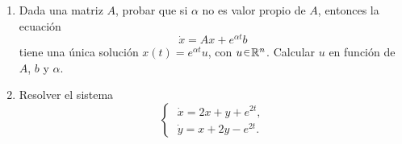 \begin{ejer}
\begin{enumerate}[label = (\alph*)]
\item Dada una matriz $A$, probar que si $\alpha$ no es valor propio de $A$,
entonces la ecuación
\[
\dot{x} = Ax + e^{\alpha t} b
\]
tiene una única solución $x(t) = e^{\alpha t}u$, con $u \en \mathbb{R}^n$.
Calcular $u$ en función de $A$, $b$ y $\alpha$.

\item Resolver el sistema
\[
\begin{cases}
\;\dot{x} = 2x + y + e^{2t}, \\
\;\dot{y} = x + 2y - e^{2t}.
\end{cases}
\]
\end{enumerate}
\end{ejer}
